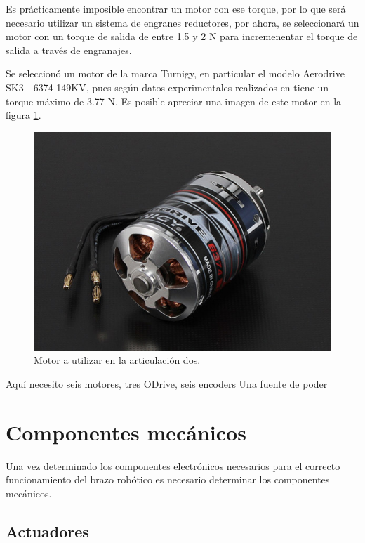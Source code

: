 Es prácticamente imposible encontrar un motor con ese torque, por lo que será necesario utilizar un sistema de engranes reductores, por ahora, se seleccionará un motor con un torque de salida de entre 1.5 y 2 N para incremenentar el torque de salida a través de engranajes.

Se seleccionó un motor de la marca Turnigy, en particular el modelo Aerodrive SK3 - 6374-149KV, pues según datos experimentales realizados en \cite{odrivedoc} tiene un torque máximo de 3.77 N. Es posible apreciar una imagen de este motor en la figura \ref{fig:sk36374}.

\begin{figure}
    \centering
    \includegraphics[scale=0.6]{./img/chapter3/sk36374.jpg}
    \caption{Motor a utilizar en la articulación dos.}
    \label{fig:sk36374}
\end{figure}




Aquí necesito seis motores, tres ODrive, seis encoders
Una fuente de poder 

\section{Componentes mecánicos}


Una vez determinado los componentes electrónicos necesarios para el correcto funcionamiento del brazo robótico es necesario determinar los componentes mecánicos.

\subsection{Actuadores}

